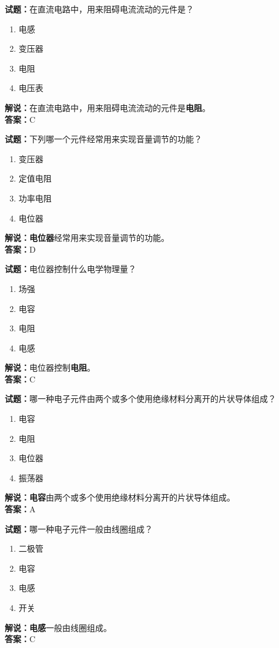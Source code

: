 \documentclass{ctexbook}
\begin{document}
\bigskip


\noindent\textbf{试题：}在直流电路中，用来阻碍电流流动的元件是？
\begin{enumerate}[leftmargin=3em]
\item 电感
\item 变压器
\item 电阻
\item 电压表
\end{enumerate}
\noindent\textbf{解说：}在直流电路中，用来阻碍电流流动的元件是\textbf{电阻}。\\\noindent\textbf{答案：}C

\bigskip


\noindent\textbf{试题：}下列哪一个元件经常用来实现音量调节的功能？
\begin{enumerate}[leftmargin=3em]
\item 变压器
\item 定值电阻
\item 功率电阻
\item 电位器
\end{enumerate}
\noindent\textbf{解说：}\textbf{电位器}经常用来实现音量调节的功能。\\\noindent\textbf{答案：}D


\bigskip


\noindent\textbf{试题：}电位器控制什么电学物理量？
\begin{enumerate}[leftmargin=3em]
\item 场强
\item 电容
\item 电阻
\item 电感
\end{enumerate}
\noindent\textbf{解说：}电位器控制\textbf{电阻}。\\\noindent\textbf{答案：}C

\bigskip


\noindent\textbf{试题：}哪一种电子元件由两个或多个使用绝缘材料分离开的片状导体组成？
\begin{enumerate}[leftmargin=3em]
\item 电容
\item 电阻
\item 电位器
\item 振荡器
\end{enumerate}
\noindent\textbf{解说：}\textbf{电容}由两个或多个使用绝缘材料分离开的片状导体组成。\\\noindent\textbf{答案：}A


\bigskip


\noindent\textbf{试题：}哪一种电子元件一般由线圈组成？
\begin{enumerate}[leftmargin=3em]
\item 二极管
\item 电容
\item 电感
\item 开关
\end{enumerate}
\noindent\textbf{解说：}\textbf{电感}一般由线圈组成。\\\noindent\textbf{答案：}C
\end{document}
